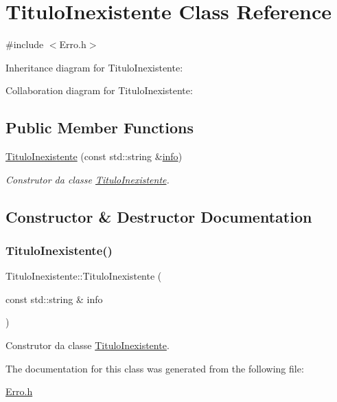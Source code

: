 \hypertarget{class_titulo_inexistente}{}\section{Titulo\+Inexistente Class Reference}
\label{class_titulo_inexistente}


{\ttfamily \#include $<$Erro.\+h$>$}



Inheritance diagram for Titulo\+Inexistente\+:


Collaboration diagram for Titulo\+Inexistente\+:
\subsection*{Public Member Functions}
\begin{DoxyCompactItemize}
\item 
\mbox{\hyperlink{class_titulo_inexistente_a0404090789fc608b5a08027bba811784}{Titulo\+Inexistente}} (const std\+::string \&\mbox{\hyperlink{class_erro_a3ecaaf6f8e15a0830a648035b456cb62}{info}})
\begin{DoxyCompactList}\small\item\em Construtor da classe \mbox{\hyperlink{class_titulo_inexistente}{Titulo\+Inexistente}}. \end{DoxyCompactList}\end{DoxyCompactItemize}


\subsection{Constructor \& Destructor Documentation}
\mbox{\label{class_titulo_inexistente_a0404090789fc608b5a08027bba811784}} 
\subsubsection{\texorpdfstring{Titulo\+Inexistente()}{TituloInexistente()}}
{\footnotesize\ttfamily Titulo\+Inexistente\+::\+Titulo\+Inexistente (\begin{DoxyParamCaption}\item[{const std\+::string \&}]{info }\end{DoxyParamCaption})\hspace{0.3cm}{\ttfamily [inline]}}



Construtor da classe \mbox{\hyperlink{class_titulo_inexistente}{Titulo\+Inexistente}}. 



The documentation for this class was generated from the following file\+:\begin{DoxyCompactItemize}
\item 
\mbox{\hyperlink{_erro_8h}{Erro.\+h}}\end{DoxyCompactItemize}
